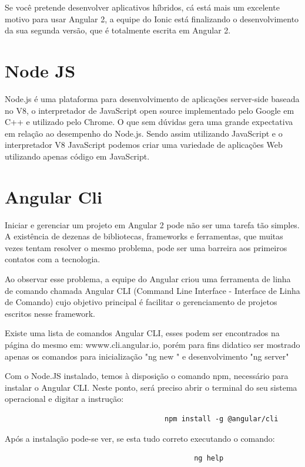\documentclass[12pt]{article}
\begin{document}
Se você pretende desenvolver aplicativos híbridos, cá está mais um excelente motivo para usar Angular 2, a equipe do Ionic está finalizando o desenvolvimento da sua segunda versão, que é totalmente escrita em Angular 2.

\section{Node JS}
Node.js é uma plataforma para desenvolvimento de aplicações server-side baseada no V8, o interpretador de JavaScript open source implementado pelo Google em C++ e utilizado pelo Chrome. O que sem dúvidas gera uma grande expectativa em relação ao desempenho do Node.js. Sendo assim utilizando JavaScript e o interpretador V8 JavaScript podemos criar uma variedade de aplicações Web utilizando apenas código em JavaScript.


\section{Angular Cli}
Iniciar e gerenciar um projeto em Angular 2 pode não ser uma tarefa tão simples. A existência de dezenas de bibliotecas, frameworks e ferramentas, que muitas vezes tentam resolver o mesmo problema, pode ser uma barreira aos primeiros contatos com a tecnologia.

Ao observar esse problema, a equipe do Angular criou uma ferramenta de linha de comando chamada Angular CLI (Command Line Interface - Interface de Linha de Comando) cujo objetivo principal é facilitar o gerenciamento de projetos escritos nesse framework.

Existe uma lista de comandos Angular CLI, esses podem ser encontrados na página do mesmo em: wwww.cli.angular.io, porém para fins didatico ser mostrado apenas os comandos para inicialização "ng new " e desenvolvimento "ng server" 

Com o Node.JS instalado, temos à disposição o comando npm, necessário para instalar o Angular CLI. Neste ponto, será preciso abrir o terminal do seu sistema operacional e digitar a instrução:
\begin{verbatim}
	                                  npm install -g @angular/cli
\end{verbatim}

Após a instalação pode-se ver, se esta tudo correto executando o comando:

\begin{verbatim}
                                             ng help
\end{verbatim}
\end{document}
